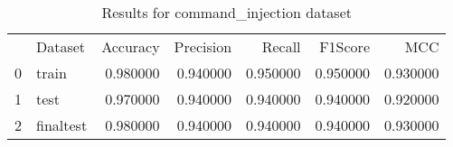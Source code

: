 \begin{table}
\caption{Results for command_injection dataset}
\begin{tabular}{llrrrrr}
 & Dataset & Accuracy & Precision & Recall & F1Score & MCC \\
0 & train & 0.980000 & 0.940000 & 0.950000 & 0.950000 & 0.930000 \\
1 & test & 0.970000 & 0.940000 & 0.940000 & 0.940000 & 0.920000 \\
2 & finaltest & 0.980000 & 0.940000 & 0.940000 & 0.940000 & 0.930000 \\
\end{tabular}
\end{table}
